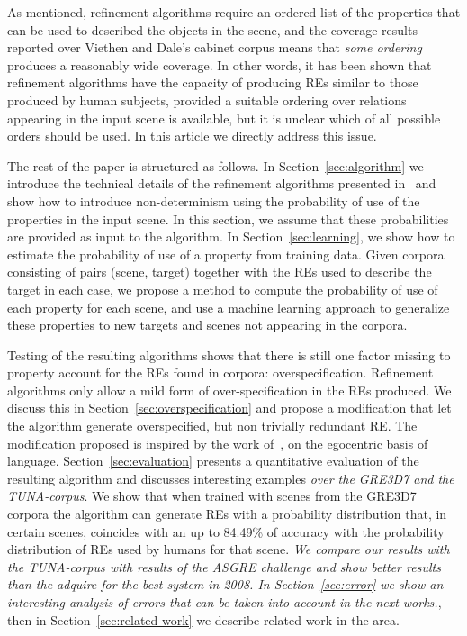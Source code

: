 As mentioned, refinement algorithms require an 
ordered list of the properties that can be used to described the objects in the scene, and the coverage results reported over Viethen and 
Dale's cabinet corpus means that \emph{some ordering} produces a reasonably wide coverage.  In other words, it has been shown that refinement algorithms have the capacity of producing REs similar to those produced by human subjects, provided a suitable ordering over relations appearing 
in the input scene is available, but it is unclear which of all possible orders should be used.  In this article we directly address this issue.  


The rest of the paper is structured as follows. In Section~\ref{sec:algorithm} we introduce the technical details of the 
refinement algorithms presented in~\cite{arec2:2008:Areces,arec:usin11} and show how to introduce non-determinism using 
the probability of use of the properties in the input scene. In this section, we assume that these probabilities are provided as 
input to the algorithm. In Section~\ref{sec:learning}, we show how to estimate the 
probability of use of a property from training data. Given corpora consisting of pairs (scene, target) together with the REs used to 
describe the target in each case, we propose a method to compute the probability of use of each property for each scene, and use a machine learning approach to generalize these properties to new targets and scenes not appearing in the corpora. 

Testing of the resulting algorithms shows that there is still one factor missing to property account for the REs found in corpora: overspecification.  Refinement algorithms only allow a mild form of over-specification in the REs produced.  We discuss this in 
Section~\ref{sec:overspecification} and propose a modification that let the algorithm generate overspecified, but non trivially redundant RE.  The modification proposed is inspired by the work of~\cite{keysar:Curr98}, on the egocentric basis of language.  
Section~\ref{sec:evaluation} presents a quantitative evaluation of the resulting algorithm and discusses interesting examples \textit{over the GRE3D7 and the TUNA-corpus}. 
We show that when trained with scenes from the GRE3D7 corpora the algorithm can generate REs with a probability distribution that, 
in certain scenes, coincides with an up to 84.49\% of accuracy with the probability distribution of REs used by humans for that scene. 
\textit{We compare our results with the TUNA-corpus with results of the ASGRE challenge and show better results than the adquire for the best system in 2008.
In Section~\ref{sec:error} we show an interesting analysis of errors that can be taken into account in the next works.}, then in Section~\ref{sec:related-work} we describe related work in the area.

